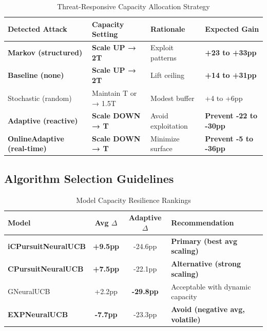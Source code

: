 \documentclass[11pt,a4paper]{article}
\newcommand{\critical}[1]{\textcolor{criticalcolor}{\textbf{#1}}}
\newcommand{\success}[1]{\textcolor{successcolor}{\textbf{#1}}}
\begin{document}
\begin{table}[h]
\scriptsize
\centering
\begin{tabular}{llll}
\toprule
\textbf{Detected Attack} & \textbf{Capacity Setting} & \textbf{Rationale} & \textbf{Expected Gain} \\
\midrule
\success{Markov (structured)} & \success{Scale UP → 2T} & Exploit patterns & \success{+23 to +33pp} \\
\success{Baseline (none)} & \success{Scale UP → 2T} & Lift ceiling & \success{+14 to +31pp} \\
Stochastic (random) & Maintain T or → 1.5T & Modest buffer & +4 to +6pp \\
\critical{Adaptive (reactive)} & \critical{Scale DOWN → T} & Avoid exploitation & \critical{Prevent -22 to -30pp} \\
\critical{OnlineAdaptive (real-time)} & \critical{Scale DOWN → T} & Minimize surface & \critical{Prevent -5 to -36pp} \\
\bottomrule
\end{tabular}
\vspace{-0.2cm}
\caption{Threat-Responsive Capacity Allocation Strategy}
\end{table}

\subsection{Algorithm Selection Guidelines}

\vspace{-0.4cm}

\begin{table}[h]
\scriptsize
\centering
\begin{tabular}{lccl}
\toprule
\textbf{Model} & \textbf{Avg $\Delta$} & \textbf{Adaptive $\Delta$} & \textbf{Recommendation} \\
\midrule
\success{iCPursuitNeuralUCB} & \success{+9.5pp} & -24.6pp & \success{Primary (best avg scaling)} \\
\success{CPursuitNeuralUCB} & \success{+7.5pp} & -22.1pp & \success{Alternative (strong scaling)} \\
GNeuralUCB & +2.2pp & \critical{-29.8pp} & Acceptable with dynamic capacity \\
\critical{EXPNeuralUCB} & \critical{-7.7pp} & -23.3pp & \critical{Avoid (negative avg, volatile)} \\
\bottomrule
\end{tabular}
\vspace{-0.2cm}
\caption{Model Capacity Resilience Rankings}
\end{table}
\end{document}
